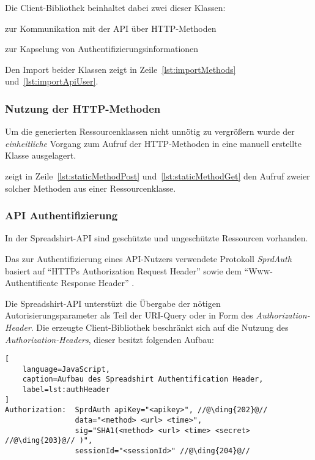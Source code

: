 Die Client-Bibliothek beinhaltet dabei zwei dieser Klassen:
\begin{compactenum}
  \item zur Kommunikation mit der \gls{API} über \gls{HTTP}-Methoden
  \item zur Kapselung von Authentifizierungsinformationen
\end{compactenum}

Den Import beider Klassen zeigt  in Zeile~\ref{lst:importMethods} und~\ref{lst:importApiUser}.

\subsubsection{Nutzung der HTTP-Methoden}
\label{sec:staticMethodsClass}

Um die generierten Ressourcenklassen nicht unnötig zu vergrößern wurde der \emph{einheitliche} Vorgang zum Aufruf der \gls{HTTP}-Methoden in eine manuell erstellte Klasse ausgelagert.

 zeigt in Zeile~\ref{lst:staticMethodPost} und~\ref{lst:staticMethodGet} den Aufruf zweier solcher Methoden aus einer Ressourcenklasse.

\subsubsection{API Authentifizierung}
\label{sec:api_auth}

In der Spreadshirt-\gls{API} sind geschützte und ungeschützte Ressourcen vorhanden. 

Das zur Authentifizierung eines \gls{API}-Nutzers verwendete Protokoll \emph{SprdAuth} basiert auf \enquote{\gls{HTTP}s Authorization Request Header} sowie dem \enquote{\textsc{Www}-Authentificate Response Header} \cite{apiSecurity}.

Die Spreadshirt-\gls{API} unterstüzt die Übergabe der nötigen Autorisierungsparameter als Teil der \gls{URI}-Query oder in Form des \emph{Authorization-Header}. Die erzeugte Client-Bibliothek beschränkt sich auf die Nutzung des \emph{Authorization-Headers}, dieser besitzt folgenden Aufbau:

\begin{lstlisting}[
    language=JavaScript,
    caption=Aufbau des Spreadshirt Authentification Header,
    label=lst:authHeader
]
Authorization:  SprdAuth apiKey="<apikey>", //@\ding{202}@// 
                data="<method> <url> <time>", 
                sig="SHA1(<method> <url> <time> <secret> //@\ding{203}@// )", 
                sessionId="<sessionId>" //@\ding{204}@//
\end{lstlisting}

